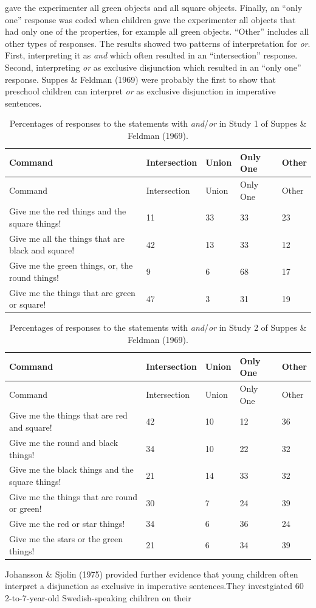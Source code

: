 \documentclass[oneside]{report}
\theoremstyle{definition}
\theoremstyle{definition}
\theoremstyle{definition}
\theoremstyle{remark}
\begin{document}
gave the experimenter all green objects and all square objects. Finally,
an ``only one'' response was coded when children gave the experimenter
all objects that had only one of the properties, for example all green
objects. ``Other'' includes all other types of responses. The results
showed two patterns of interpretation for \emph{or}. First, interpreting
it as \emph{and} which often resulted in an ``intersection'' response.
Second, interpreting \emph{or} as exclusive disjunction which resulted
in an ``only one'' response. Suppes \& Feldman (1969) were probably the
first to show that preschool children can interpret \emph{or} as
exclusive disjunction in imperative sentences.
\begin{longtable}[]{@{}lllll@{}}
\caption{\label{tab:suppesFeldmanOne} Percentages of responses to the
statements with \emph{and}/\emph{or} in Study 1 of Suppes \& Feldman
(1969).}\tabularnewline
\toprule
Command & Intersection & Union & Only One & Other\tabularnewline
\midrule
\endfirsthead
\toprule
Command & Intersection & Union & Only One & Other\tabularnewline
\midrule
\endhead
Give me the red things and the square things! & 11 & 33 & 33 &
23\tabularnewline
Give me all the things that are black and square! & 42 & 13 & 33 &
12\tabularnewline
Give me the green things, or, the round things! & 9 & 6 & 68 &
17\tabularnewline
Give me the things that are green or square! & 47 & 3 & 31 &
19\tabularnewline
\bottomrule
\end{longtable}
\begin{longtable}[]{@{}lllll@{}}
\caption{\label{tab:suppesFeldmanTwo} Percentages of responses to the
statements with \emph{and}/\emph{or} in Study 2 of Suppes \& Feldman
(1969).}\tabularnewline
\toprule
Command & Intersection & Union & Only One & Other\tabularnewline
\midrule
\endfirsthead
\toprule
Command & Intersection & Union & Only One & Other\tabularnewline
\midrule
\endhead
Give me the things that are red and square! & 42 & 10 & 12 &
36\tabularnewline
Give me the round and black things! & 34 & 10 & 22 & 32\tabularnewline
Give me the black things and the square things! & 21 & 14 & 33 &
32\tabularnewline
Give me the things that are round or green! & 30 & 7 & 24 &
39\tabularnewline
Give me the red or star things! & 34 & 6 & 36 & 24\tabularnewline
Give me the stars or the green things! & 21 & 6 & 34 & 39\tabularnewline
\bottomrule
\end{longtable}
Johansson \& Sjolin (1975) provided further evidence that young children
often interpret a disjunction as exclusive in imperative sentences.They
investgiated 60 2-to-7-year-old Swedish-speaking children on their
\end{document}

